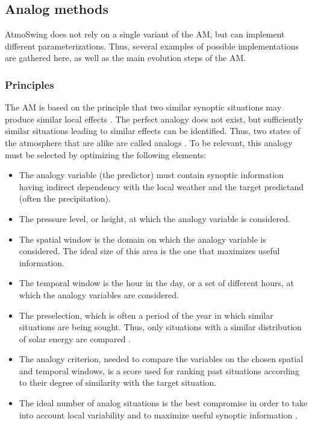 \documentclass[review]{elsarticle}
\begin{document}
\subsection{Analog methods}
\label{sec:method}

AtmoSwing does not rely on a single variant of the AM, but can implement different parameterizations. Thus, several examples of possible implementations are gathered here, as well as the main evolution steps of the AM.

\subsubsection{Principles}

The AM is based on the principle that two similar synoptic situations may produce similar local effects \citep{Lorenz1956}. The perfect analogy does not exist, but sufficiently similar situations leading to similar effects can be identified. Thus, two states of the atmosphere that are alike are called analogs \citep{Lorenz1969}. To be relevant, this analogy must be selected by optimizing the following elements:

\begin{itemize}
	\item The analogy variable (the predictor) must contain synoptic information having indirect dependency with the local weather and the target predictand (often the precipitation).
	\item The pressure level, or height, at which the analogy variable is considered.
	\item The spatial window is the domain on which the analogy variable is considered. The ideal size of this area is the one that maximizes useful information.
	\item The temporal window is the hour in the day, or a set of different hours, at which the analogy variables are considered.
	\item The preselection, which is often a period of the year in which similar situations are being sought. Thus, only situations with a similar distribution of solar energy are compared \citep{Lorenz1969}.
	\item The analogy criterion, needed to compare the variables on the chosen spatial and temporal windows, is a score used for ranking past situations according to their degree of similarity with the target situation.
	\item The ideal number of analog situations is the best compromise in order to take into account local variability and to maximize useful synoptic information \citep{Bontron2004}.
\end{itemize}
\end{document}
